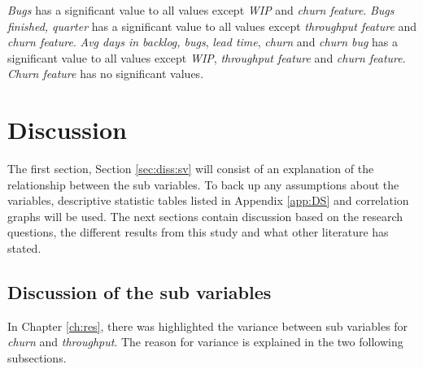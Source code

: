 \documentclass[UKenglish]{ifimaster}  %
\begin{document}
\textit{Bugs} has a significant value to all values except \textit{WIP} and \textit{churn feature}. \textit{Bugs finished, quarter} has a significant value to all values except \textit{throughput feature} and \textit{churn feature}. \textit{Avg days in backlog, bugs}, \textit{lead time}, \textit{churn} and \textit{churn bug} has a significant value to all values except \textit{WIP}, \textit{throughput feature} and \textit{churn feature}. \textit{Churn feature} has no significant values.



\chapter{Discussion}
\label{ch:dis}
The first section, Section \ref{sec:diss:sv} will consist of an explanation of the relationship between the sub variables. To back up any assumptions about the variables, descriptive statistic tables listed in Appendix \ref{app:DS} and correlation graphs will be used. The next sections contain discussion based on the research questions, the different results from this study and what other literature has stated. 



\section{Discussion of the sub variables}
In Chapter \ref{ch:res}, there was highlighted the variance between sub variables for \textit{churn} and \textit{throughput}. The reason for variance is explained in the two following subsections.
\label{sec:diss:sv}
\end{document}
